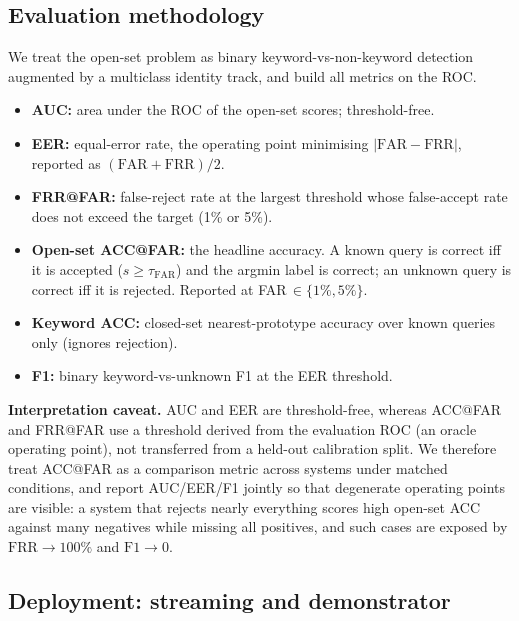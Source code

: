 \documentclass[12pt,a4paper]{article}
\begin{document}
\subsection{Evaluation methodology}\label{sec:eval}

We treat the open-set problem as binary keyword-vs-non-keyword detection
augmented by a multiclass identity track, and build all metrics on the ROC.
\begin{itemize}[leftmargin=1.3em,itemsep=1pt]
\item \textbf{AUC:} area under the ROC of the open-set scores; threshold-free.
\item \textbf{EER:} equal-error rate, the operating point minimising
$|\text{FAR}-\text{FRR}|$, reported as $(\text{FAR}+\text{FRR})/2$.
\item \textbf{FRR@FAR:} false-reject rate at the largest threshold whose
false-accept rate does not exceed the target (1\% or 5\%).
\item \textbf{Open-set ACC@FAR:} the headline accuracy. A known query is correct
iff it is accepted ($s\ge\tau_{\text{FAR}}$) and the argmin label is correct; an
unknown query is correct iff it is rejected. Reported at FAR\,$\in\{1\%, 5\%\}$.
\item \textbf{Keyword ACC:} closed-set nearest-prototype accuracy over known
queries only (ignores rejection).
\item \textbf{F1:} binary keyword-vs-unknown F1 at the EER threshold.
\end{itemize}

\textbf{Interpretation caveat.} AUC and EER are threshold-free, whereas ACC@FAR
and FRR@FAR use a threshold derived from the evaluation ROC (an oracle operating
point), not transferred from a held-out calibration split. We therefore treat
ACC@FAR as a comparison metric across systems under matched conditions, and
report AUC/EER/F1 jointly so that degenerate operating points are visible: a
system that rejects nearly everything scores high open-set ACC against many
negatives while missing all positives, and such cases are exposed by
$\text{FRR}\to100\%$ and $\text{F1}\to0$.

\subsection{Deployment: streaming and demonstrator}\label{sec:deploy}
\end{document}
